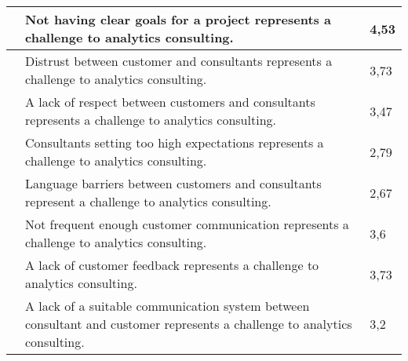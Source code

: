 \documentclass[../main.tex]{subfiles}
\begin{document}
\begin{dontcount}
\begin{xltabular}[h]{\linewidth}{| N X | m{2.2cm}|}
        \hline
        \label{q:8}&\hspace{-0.8em}Not having clear goals for a project represents a challenge to analytics consulting. & 4,53  \\
        \hline
        \label{q:9}&\hspace{-0.8em}Distrust between customer and consultants represents a challenge to analytics consulting. & 3,73  \\
        \hline
        \label{q:10}&\hspace{-0.8em}A lack of respect between customers and consultants represents a challenge to analytics consulting. & 3,47  \\
        \hline
        \label{q:11}&\hspace{-0.8em}Consultants setting too high expectations represents a challenge to analytics consulting. & 2,79  \\
        \hline
        \label{q:12}&\hspace{-0.8em}Language barriers between customers and consultants represent a challenge to analytics consulting. & 2,67  \\
        \hline
        \label{q:13}&\hspace{-0.8em}Not frequent enough customer communication represents a challenge to analytics consulting. & 3,6  \\
        \hline
        \label{q:14}&\hspace{-0.8em}A lack of customer feedback represents a challenge to analytics consulting. & 3,73  \\
        \hline
        \label{q:15}&\hspace{-0.8em}A lack of a suitable communication system between consultant and customer represents a challenge to analytics consulting. & 3,2  \\
        \hline
    \end{xltabular}
\end{dontcount}
\end{document}

